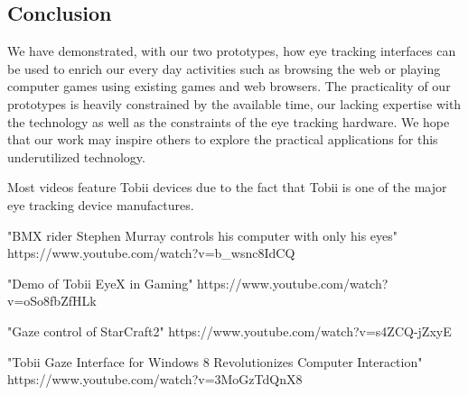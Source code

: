 \documentclass[english]{tktltiki}
\begin{document}
\subsection{Conclusion}

We have demonstrated, with our two prototypes, how eye tracking interfaces can be used to enrich our every day activities such as browsing the web or playing computer games using existing games and web browsers. The practicality of our prototypes is heavily constrained by the available time, our lacking expertise with the technology as well as the constraints of the eye tracking hardware. We hope that our work may inspire others to explore the practical applications for this underutilized technology.
      










\lastpage

\appendices

\pagestyle{empty}


Most videos feature Tobii devices due to the fact that Tobii is one of the major eye tracking device manufactures.

"BMX rider Stephen Murray controls his computer with only his eyes"
https://www.youtube.com/watch?v=b\_wsnc8IdCQ

"Demo of Tobii EyeX in Gaming"
https://www.youtube.com/watch?v=oSo8fbZfHLk

"Gaze control of StarCraft2"
https://www.youtube.com/watch?v=s4ZCQ-jZxyE

"Tobii Gaze Interface for Windows 8 Revolutionizes Computer Interaction"
https://www.youtube.com/watch?v=3MoGzTdQnX8
\end{document}
